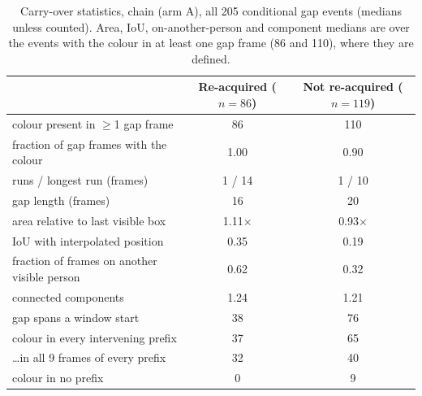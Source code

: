\documentclass{article} %
\newcommand{\rev}[1]{#1}
\begin{document}
\begin{table}[h]
\caption{\rev{Carry-over statistics, chain (arm A), all 205 conditional gap events
(medians unless counted). Area, IoU, on-another-person and component medians are over the
events with the colour in at least one gap frame (86 and 110), where they are defined.}}
\label{tab:mech}
\begin{center}
\scriptsize
\begin{tabular}{lcc}
\toprule
 & \rev{Re-acquired ($n{=}86$)} & \rev{Not re-acquired ($n{=}119$)} \\
\midrule
\rev{colour present in $\geq$1 gap frame} & \rev{86} & \rev{110} \\
\rev{fraction of gap frames with the colour} & \rev{1.00} & \rev{0.90} \\
\rev{runs / longest run (frames)} & \rev{1 / 14} & \rev{1 / 10} \\
\rev{gap length (frames)} & \rev{16} & \rev{20} \\
\rev{area relative to last visible box} & \rev{1.11$\times$} & \rev{0.93$\times$} \\
\rev{IoU with interpolated position} & \rev{0.35} & \rev{0.19} \\
\rev{fraction of frames on another visible person} & \rev{0.62} & \rev{0.32} \\
\rev{connected components} & \rev{1.24} & \rev{1.21} \\
\rev{gap spans a window start} & \rev{38} & \rev{76} \\
\rev{\quad colour in every intervening prefix} & \rev{37} & \rev{65} \\
\rev{\quad \ldots in all 9 frames of every prefix} & \rev{32} & \rev{40} \\
\rev{\quad colour in no prefix} & \rev{0} & \rev{9} \\
\bottomrule
\end{tabular}
\end{center}
\end{table}
\end{document}
